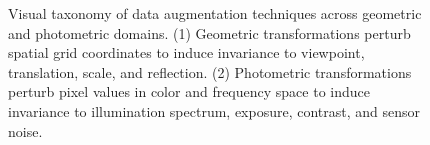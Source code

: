 \begin{figure}[H]
\caption{Visual taxonomy of data augmentation techniques across geometric and photometric domains. (1) Geometric transformations perturb spatial grid coordinates to induce invariance to viewpoint, translation, scale, and reflection. (2) Photometric transformations perturb pixel values in color and frequency space to induce invariance to illumination spectrum, exposure, contrast, and sensor noise.}
\label{fig:data_augmentation_visual_taxonomy}
\end{figure}

